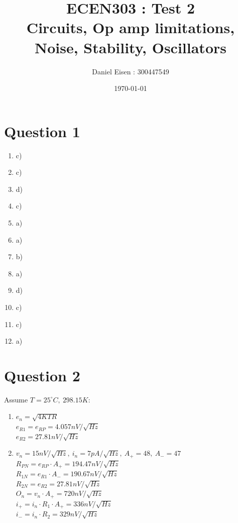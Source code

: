 \documentclass[11pt]{article}
\title{ECEN303 : Test 2 \\ Circuits, Op amp limitations, Noise, Stability, Oscillators}
\author{Daniel Eisen : 300447549}
\date{\today}
\begin{document}
\begin{preview}
\maketitle
\section*{Question 1}
\begin{enumerate}[label=\alph*)]
        \item c)
        \item c)
        \item d)
        \item c)
        \item a)
        \item a)
        \item b)
        \item a)
        \item d)
        \item c)
        \item c)
        \item a)
\end{enumerate}

\section*{Question 2}
Assume $T=25^{\circ}C,\:298.15K$:
\begin{enumerate}[label=\roman*)]
        \item   $e_{n} = \sqrt{4KTR}$\\
                $e_{R1} = e_{RP} = 4.057 nV/\sqrt{Hz}$\\
                $e_{R2} = 27.81 nV/\sqrt{Hz}$\\

        \item   $v_n=15nV/\sqrt{Hz},\:i_n=7pA/\sqrt{Hz},\:A_{+}=48,\:A_{-}=47$\\

                $R_{PN}=e_{RP}\cdot A_{+} = 194.47nV/\sqrt{Hz}$\\
                $R_{1N}=e_{R1}\cdot A_{-} = 190.67nV/\sqrt{Hz}$\\
                $R_{2N}=e_{R2} = 27.81 nV/\sqrt{Hz}$\\
                $O_{n}=v_{n}\cdot A_{+} = 720nV/\sqrt{Hz}$\\
                $i_{+}=i_{n}\cdot R_{1}\cdot A_{+} = 336nV/\sqrt{Hz}$\\
                $i_{-}=i_{n}\cdot R_{2} = 329nV/\sqrt{Hz}$\\


\end{enumerate}
\end{preview}
\end{document}
